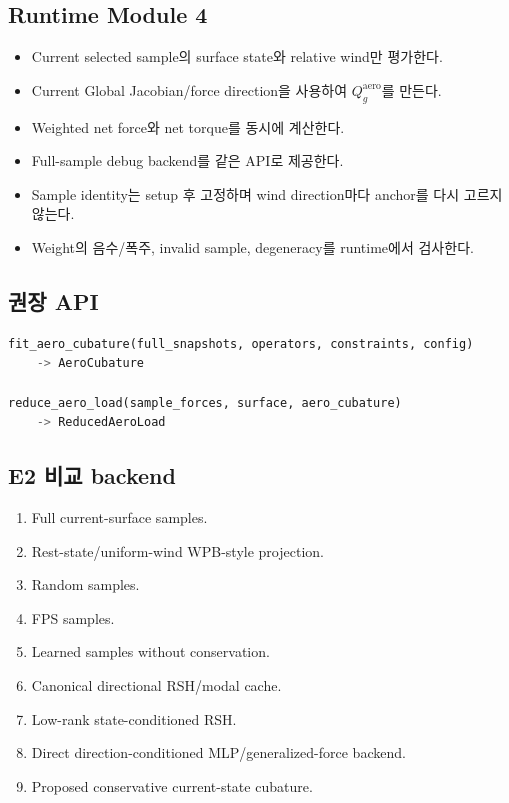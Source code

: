 \documentclass[10pt,a4paper]{article}
\newcommand{\todo}{\textcolor{TodoGray}{\(\square\)}}
\begin{document}
\subsection*{Runtime Module 4}

\begin{itemize}
  \item[\todo] Current selected sample의 surface state와 relative wind만 평가한다.
  \item[\todo] Current Global Jacobian/force direction을 사용하여 \(Q_g^{\mathrm{aero}}\)를 만든다.
  \item[\todo] Weighted net force와 net torque를 동시에 계산한다.
  \item[\todo] Full-sample debug backend를 같은 API로 제공한다.
  \item[\todo] Sample identity는 setup 후 고정하며 wind direction마다 anchor를 다시 고르지 않는다.
  \item[\todo] Weight의 음수/폭주, invalid sample, degeneracy를 runtime에서 검사한다.
\end{itemize}

\subsection*{권장 API}

\begin{lstlisting}[language=Python]
fit_aero_cubature(full_snapshots, operators, constraints, config)
    -> AeroCubature

reduce_aero_load(sample_forces, surface, aero_cubature)
    -> ReducedAeroLoad
\end{lstlisting}

\subsection*{E2 비교 backend}

\begin{enumerate}
  \item Full current-surface samples.
  \item Rest-state/uniform-wind WPB-style projection.
  \item Random samples.
  \item FPS samples.
  \item Learned samples without conservation.
  \item Canonical directional RSH/modal cache.
  \item Low-rank state-conditioned RSH.
  \item Direct direction-conditioned MLP/generalized-force backend.
  \item Proposed conservative current-state cubature.
\end{enumerate}
\end{document}
